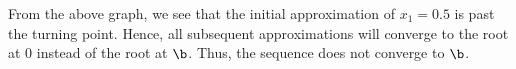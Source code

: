 \begin{solution}
\begin{ppart}
\begin{center}
        \end{center}
        
        From the above graph, we see that the initial approximation of $x_1 = 0.5$ is past the turning point. Hence, all subsequent approximations will converge to the root at $0$ instead of the root at $\b$. Thus, the sequence does not converge to $\b$.
    \end{ppart}
\end{solution}

